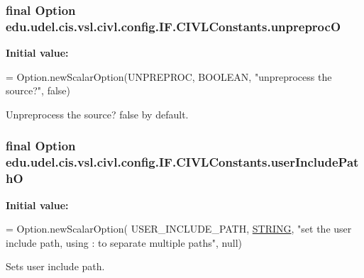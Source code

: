 \subsubsection[{unpreproc\+O}]{\setlength{\rightskip}{0pt plus 5cm}final Option edu.\+udel.\+cis.\+vsl.\+civl.\+config.\+I\+F.\+C\+I\+V\+L\+Constants.\+unpreproc\+O\hspace{0.3cm}{\ttfamily [static]}}\label{classedu_1_1udel_1_1cis_1_1vsl_1_1civl_1_1config_1_1IF_1_1CIVLConstants_a6da1d3d2111e64af4a8640cfa70249f0}
{\bfseries Initial value\+:}
\begin{DoxyCode}
= Option.newScalarOption(UNPREPROC,
            BOOLEAN, \textcolor{stringliteral}{"unpreprocess the source?"}, \textcolor{keyword}{false})
\end{DoxyCode}


Unpreprocess the source? false by default. 

\hypertarget{classedu_1_1udel_1_1cis_1_1vsl_1_1civl_1_1config_1_1IF_1_1CIVLConstants_aeac57e9e85d9dd0b66651b1060dd9175}{}
\subsubsection[{user\+Include\+Path\+O}]{\setlength{\rightskip}{0pt plus 5cm}final Option edu.\+udel.\+cis.\+vsl.\+civl.\+config.\+I\+F.\+C\+I\+V\+L\+Constants.\+user\+Include\+Path\+O\hspace{0.3cm}{\ttfamily [static]}}\label{classedu_1_1udel_1_1cis_1_1vsl_1_1civl_1_1config_1_1IF_1_1CIVLConstants_aeac57e9e85d9dd0b66651b1060dd9175}
{\bfseries Initial value\+:}
\begin{DoxyCode}
= Option.newScalarOption(
            USER\_INCLUDE\_PATH, \hyperlink{struct__STRING}{STRING},
            \textcolor{stringliteral}{"set the user include path, using : to separate multiple paths"},
            null)
\end{DoxyCode}


Sets user include path. 

\hypertarget{classedu_1_1udel_1_1cis_1_1vsl_1_1civl_1_1config_1_1IF_1_1CIVLConstants_a4ddd080c8bf9bf33ef356eaa13390a9e}{}
